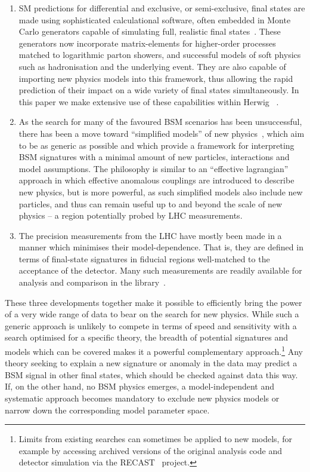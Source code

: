 \documentclass[floatfix]{article}
\begin{document}
\begin{enumerate}
\item
SM predictions for differential and exclusive, or semi-exclusive, final states are made using sophisticated 
calculational software, often embedded in Monte Carlo generators capable of simulating full, realistic final 
states~\cite{Buckley:2011ms}. These generators now incorporate matrix-elements for higher-order processes
matched to logarithmic parton showers, and successful models of soft physics such as hadronisation and
the underlying event. They are also capable of importing new physics models into this framework, thus allowing
the rapid prediction of their impact on a wide variety of final states simultaneously. 
In this paper we make extensive use of these capabilities within Herwig~\cite{Bahr:2008pv} .
\item
As the search for many of the favoured BSM scenarios has been unsuccessful, there has been a move toward 
``simplified models'' of new physics~\cite{Alves:2011wf,Abercrombie:2015wmb}, which aim to be as generic as possible 
and which provide a framework for interpreting BSM signatures with a minimal amount of 
new particles, interactions and model assumptions. The philosophy is similar to an ``effective lagrangian'' approach in which effective anomalous
couplings are introduced to describe new physics, but is more powerful, as such simplified models also
include new particles, and thus can remain useful up to and beyond the scale of new physics -- a region 
potentially probed by LHC measurements.
\item
The precision measurements from the LHC have mostly been made in a manner which minimises their model-dependence. 
That is, they are defined in terms of final-state signatures in fiducial regions well-matched to the
acceptance of the detector. Many such measurements are readily available for analysis and
comparison in the \rivet library~\cite{Buckley:2010ar}. 
\end{enumerate}

These three developments together make it possible to efficiently 
bring the power of a very wide range of data to bear on the search for new physics. While such a generic approach is
unlikely to compete in terms of speed and sensitivity with a search optimised for a specific theory, the breadth
of potential signatures and models which can be covered makes it a powerful complementary approach.\footnote{Limits from existing 
searches can sometimes be applied to new models, for example by accessing archived versions of the original analysis code
and detector simulation via the RECAST~\cite{Cranmer:2010hk} project.}
Any theory seeking
to explain a new signature or anomaly in the data may predict a BSM signal  in other final states, which should be checked 
against data this way. If, on the other hand, no BSM physics emerges, a model-independent and systematic approach becomes mandatory to exclude 
new physics models or narrow down the corresponding model parameter space.
\end{document}
